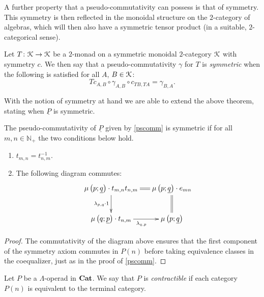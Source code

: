 A further property that a pseudo-commutativity can possess is that of symmetry. This symmetry is then reflected in the monoidal structure on the $2$-category of algebras, which will then also have a symmetric tensor product (in a suitable, $2$-categorical sense).

\begin{Defi}
Let $T \colon \mathcal{K} \rightarrow \mathcal{K}$ be a $2$-monad on a symmetric monoidal $2$-category $\mathcal{K}$ with symmetry $c$. We then say that a pseudo-commutativity $\gamma$ for $T$ is \textit{symmetric} when the following is satisfied for all $A$, $B \in \mathcal{K}$:
    \[
        Tc_{A,B} \circ \gamma_{A,B} \circ c_{TB, TA} = \gamma_{B,A}.
    \]
\end{Defi}

With the notion of symmetry at hand we are able to extend the above theorem, stating when $\underline{P}$ is symmetric.
\begin{thm}
The pseudo-commutativity of $\underline{P}$ given by \cref{pscomm}  is symmetric if for all $m,n \in \mathbb{N}_+$ the two conditions below hold.
    \begin{enumerate}
        \item $t_{m,n} = t_{n,m}^{-1}$.
        \item The following diagram commutes:
          \[
              \xy
                (0,0)*+{\mu\left(p;\underline{q}\right) \cdot t_{m,n}t_{n,m}}="00";
                (30,0)*+{\mu\left(p;\underline{q}\right) \cdot e_{mn}}="10";
                (0,-15)*+{\mu\left(q;\underline{p}\right) \cdot t_{n,m}}="01";
                (30,-15)*+{\mu\left(p;\underline{q}\right)}="11";
                {\ar@{=} "00" ; "10"};
                {\ar_{\lambda_{p,q} \cdot 1} "00" ; "01"};
                {\ar@{=} "10" ; "11"};
                {\ar_{\lambda_{q,p}} "01" ; "11"};
              \endxy
          \]
    \end{enumerate}
\end{thm}
\begin{proof}
The commutativity of the diagram above ensures that the first component of the symmetry axiom commutes in $P(n)$ before taking equivalence classes in the coequalizer, just as in the proof of \cref{pscomm}.
\end{proof}

\begin{Defi}
Let $P$ be a $\Lambda$-operad in $\mathbf{Cat}$. We say that $P$ is \textit{contractible} if each category $P(n)$ is equivalent to the terminal category.
\end{Defi}

